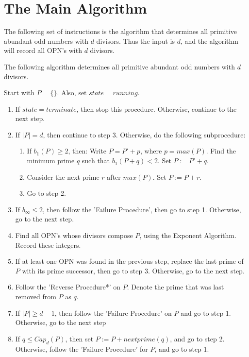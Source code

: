 \documentclass[../paper.tex]{subfiles}
\begin{document}
\section{The Main Algorithm}

The following set of instructions is the algorithm that determines
all primitive abundant odd numbers with $d$ divisors. Thus the
input is $d$, and the algorithm will record all OPN's with $d$
divisors.

\begin{theorem} The following algorithm determines all primitive
abundant odd numbers with $d$ divisors.
\end{theorem}
Start with $P = \{\}$. Also, set $state = running$.
\begin{enumerate}[label*=\arabic*.]
  
  \item If $state = terminate$, then stop this procedure.
Otherwise, continue to the next step.

  \item If $|P| = d$, then continue to step 3. Otherwise, do the
following subprocedure:

  \begin{enumerate}[label*=\alph*.]

    \item If $b_{1}(P) \geq 2$, then: Write $P = P'
 + p$, where $p = max(P)$. Find the minimum prime $q$ such that
$b_1(P + q) < 2$. Set $P := P' + q$. 
    \item Consider the next prime $r$ after $max(P)$. Set $P := P
+ r$.
    \item Go to step 2.
 
  \end{enumerate}

  \item If $b_{\infty} \leq 2$, then follow the 'Failure
        Procedure', then go to step 1. Otherwise, go to the next
        step.

  \item Find all OPN's whose divisors compose $P$, using the
        Exponent Algorithm. Record these integers.

  \item If at least one OPN was found in the previous step,
        replace the last prime of $P$ with its prime successor,
        then go to step 3. Otherwise, go to the next step.

  \item Follow the 'Reverse Procedure*' on $P$. Denote
        the prime that was last removed from $P$ as $q$. 
        
  \item If $|P| \geq d - 1$, then follow the 'Failure Procedure'
        on $P$ and go to step 1. Otherwise, go to the next step

  \item If $q \leq Cap_d(P)$, then set $P := P + nextprime(q)$,
        and go to step 2. Otherwise, follow the 'Failure
        Procedure' for $P$, and go to step 1.

\end{enumerate}
\end{document}
